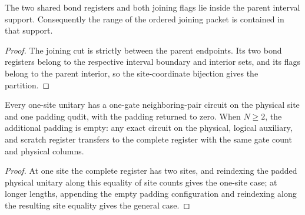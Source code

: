 \begin{lemma}
    \label{thm:mpu_joining_packet_support}
    \leanok
    The two shared bond registers and both joining flags lie inside the parent
    interval support. Consequently the range of the ordered joining packet
    is contained in that support.
\end{lemma}
\begin{proof}\leanok
    The joining cut is strictly between the parent endpoints. Its two bond
    registers belong to the respective interval boundary and interior sets, and
    its flags belong to the parent interior, so the site-coordinate bijection gives the partition.
\end{proof}

\begin{lemma}
    \label{thm:mpu_single_site_complete}
    \leanok
    Every one-site unitary has a one-gate neighboring-pair circuit on the physical
    site and one padding qudit, with the padding returned to zero. When
    $N\geq2$, the additional padding is empty: any exact circuit on the physical,
    logical auxiliary, and scratch register transfers to the complete register
    with the same gate count and physical columns.
\end{lemma}
\begin{proof}\leanok
    At one site the complete register has two sites, and reindexing the padded physical
    unitary along this equality of site counts gives the one-site case; at longer lengths, appending the
    empty padding configuration and reindexing along the resulting site equality gives the general case.
\end{proof}

